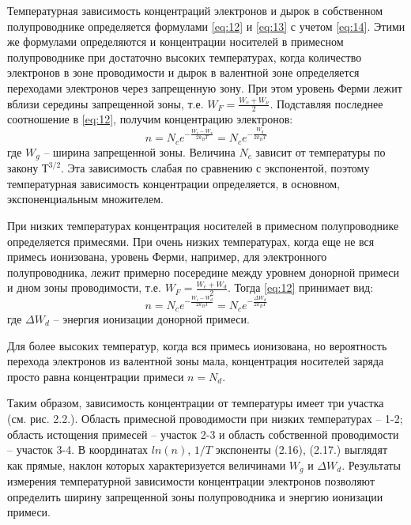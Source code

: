 Температурная зависимость концентраций электронов и дырок в собственном полупроводнике определяется формулами \eqref{eq:12} и \eqref{eq:13} с учетом
\eqref{eq:14}. Этими же формулами определяются и концентрации носителей в примесном полупроводнике при достаточно высоких
температурах, когда количество электронов в зоне проводимости и дырок в валентной зоне определяется переходами
электронов через запрещенную зону. При этом уровень Ферми лежит вблизи середины запрещенной зоны, т.е. $W_F =
\frac{W_c+W_{\nu}}{2}$. Подставляя последнее соотношение в \eqref{eq:12}, получим концентрацию электронов:
\begin{equation}
	n=N_{c} e^{-\frac{W_{c}-W_{v}}{2 k_{B} T}}=N_{c} e^{-\frac{W_{g}}{2 k_{B} T}}
	\label{eq:16}
\end{equation}
где $W_g$  – ширина запрещенной зоны. Величина $N_c$ зависит от температуры по закону $Т^{3/2}$. Эта зависимость слабая по
сравнению с экспонентой, поэтому температурная зависимость концентрации определяется, в основном, экспоненциальным
множителем. 

При низких температурах концентрация носителей в примесном полупроводнике определяется примесями. При очень низких
температурах, когда еще не вся примесь ионизована, уровень Ферми, например, для электронного полупроводника, лежит
примерно посередине между уровнем донорной примеси и дном зоны проводимости, т.е. $W_F = \frac{W_c+W_{d}}{2}$. Тогда \eqref{eq:12}
принимает вид: 
\begin{equation}
	n=N_{c} e^{-\frac{W_{c}-W_{d}}{2 k_{B} T}}=N_{c} e^{-\frac{\Delta W_{d}}{2 k_{B} T}}
	\label{eq:17}
\end{equation}
где $\Delta W_d$ – энергия ионизации донорной примеси. 


Для более высоких температур, когда вся примесь ионизована, но вероятность перехода электронов из валентной зоны мала,
концентрация носителей заряда просто равна концентрации примеси $n=N_d$. 

Таким образом, зависимость концентрации от температуры имеет три участка (см. рис. 2.2.). Область примесной проводимости
при низких температурах – 1-2; область истощения примесей – участок 2-3 и область собственной проводимости – участок
3-4. В координатах $ln(n)$, $1/T$ экспоненты (2.16), (2.17.) выглядят как прямые, наклон которых характеризуется величинами
$W_g$ и $\Delta W_d$. Результаты измерения температурной зависимости концентрации электронов позволяют определить ширину
запрещенной зоны полупроводника и энергию ионизации примеси.

